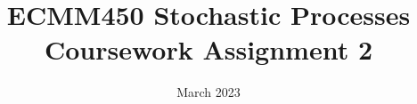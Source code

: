 \documentclass{article}
\title{%
  ECMM450 Stochastic Processes\\
  \large Coursework Assignment 2
 }
\date{March 2023}
\begin{document}
\maketitle

\newline


\end{document}

